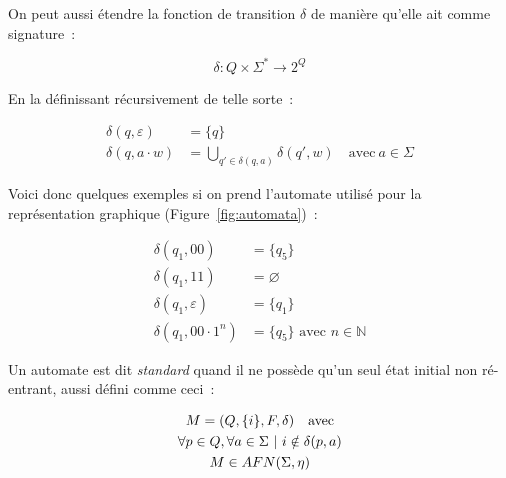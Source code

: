 

\vphantom{}

On peut aussi étendre la fonction de transition \(\delta\) de manière qu'elle
ait comme signature~:

\[
    \delta: Q \times \Sigma^* \to 2^Q
\]

En la définissant récursivement de telle sorte~:

\begin{align*}
    \delta(q, \varepsilon) & = \{q\}                                                                       \\
    \delta(q, a \cdot w)   & = \bigcup_{q' \in \delta(q, a)} \delta(q', w) \quad \text{avec}~ a \in \Sigma
\end{align*}

\begin{example}
    Voici donc quelques exemples si on prend l'automate utilisé pour la
    représentation graphique (Figure~\ref{fig:automata})~:

    \begin{align*}
        \delta(q_1, 00)           & = \{q_5\}                                \\
        \delta(q_1, 11)           & = \varnothing                            \\
        \delta(q_1, \varepsilon)  & = \{q_1\}                                \\
        \delta(q_1, 00 \cdot 1^n) & = \{q_5\} \text{ avec } n \in \mathbb{N}
    \end{align*}
\end{example}

\vphantom{}

\begin{definition}
    Un automate est dit \textit{standard} quand il ne possède qu'un seul état
    initial non ré-entrant, aussi défini comme ceci~:

    \begin{gather*}
        M = (Q, \{i\}, F, \delta) \quad \text{avec} \\
        \forall p \in Q, \forall a \in \Sigma ~|~ i \notin \delta(p, a) \notag \\
        M \in AFN(\Sigma, \eta) \notag
    \end{gather*}
\end{definition}

